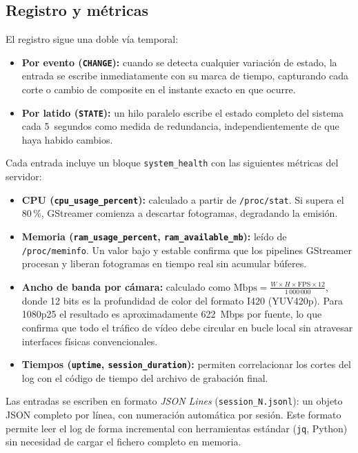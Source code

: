 \subsection{Registro y métricas}

El registro sigue una doble vía temporal:

\begin{itemize}
  \item \textbf{Por evento (\texttt{CHANGE}):} cuando se detecta cualquier variación
        de estado, la entrada se escribe inmediatamente con su marca de tiempo,
        capturando cada corte o cambio de composite en el instante exacto en que ocurre.
  \item \textbf{Por latido (\texttt{STATE}):} un hilo paralelo escribe el estado
        completo del sistema cada 5~segundos como medida de redundancia, independientemente
        de que haya habido cambios.
\end{itemize}

Cada entrada incluye un bloque \texttt{system\_health} con las siguientes métricas del
servidor:

\begin{itemize}
  \item \textbf{CPU (\texttt{cpu\_usage\_percent}):} calculado a partir de
        \texttt{/proc/stat}. Si supera el 80\,\%, GStreamer comienza a descartar
        fotogramas, degradando la emisión.
  \item \textbf{Memoria (\texttt{ram\_usage\_percent}, \texttt{ram\_available\_mb}):}
        leído de \texttt{/proc/meminfo}. Un valor bajo y estable confirma que los
        pipelines GStreamer procesan y liberan fotogramas en tiempo real sin acumular
        búferes.
  \item \textbf{Ancho de banda por cámara:} calculado como
        $\text{Mbps} = \frac{W \times H \times \text{FPS} \times 12}{1\,000\,000}$,
        donde 12 bits es la profundidad de color del formato I420 (YUV420p). Para
        1080p25 el resultado es aproximadamente 622~Mbps por fuente, lo que confirma
        que todo el tráfico de vídeo debe circular en bucle local sin atravesar
        interfaces físicas convencionales.
  \item \textbf{Tiempos (\texttt{uptime}, \texttt{session\_duration}):} permiten
        correlacionar los cortes del log con el código de tiempo del archivo de
        grabación final.
\end{itemize}

Las entradas se escriben en formato \textit{JSON Lines} (\texttt{session\_N.jsonl}):
un objeto JSON completo por línea, con numeración automática por sesión. Este formato
permite leer el log de forma incremental con herramientas estándar (\texttt{jq},
Python) sin necesidad de cargar el fichero completo en memoria.

